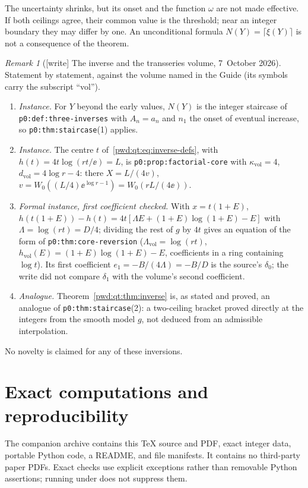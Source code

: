 \documentclass[11pt,letterpaper]{article}
\numberwithin{equation}{section}
\theoremstyle{remark}\newtheorem{remark}[theorem]{Remark}
\newcommand{\code}[1]{\texttt{\detokenize{#1}}}
\newcommand{\file}[1]{\nolinkurl{#1}}
\newcommand{\vol}{\mathrm{vol}}
\begin{document}
The uncertainty shrinks, but its onset and the function $\omega$ are not made effective. If both ceilings agree, their common value is the threshold; near an integer boundary they may differ by one. An unconditional formula $N(Y)=\lceil\xi(Y)\rceil$ is not a consequence of the theorem.

\begin{remark}[{[write]} The inverse and the transseries volume, 7~October 2026]\label{pwd:qt:rem:transseries}
Statement by statement, against the volume named in the Guide (its symbols
carry the subscript ``vol'').
\begin{enumerate}[label=(\alph*),leftmargin=*]
\item \emph{Instance.} For $Y$ beyond the early values, $N(Y)$ is the integer
staircase of \file{p0:def:three-inverses} with $A_n=a_n$ and $n_1$ the onset
of eventual increase, so \file{p0:thm:staircase}(1) applies.
\item \emph{Instance.} The centre $t$ of~\eqref{pwd:qt:eq:inverse-defs},
with $h(t)=4t\log(rt/\ee)=L$, is \file{p0:prop:factorial-core} with
$\kappa_\vol=4$, $d_\vol=4\log r-4$: there $X=L/(4v)$,
$v=W_0((L/4)\ee^{\log r-1})=W_0(rL/(4\ee))$.
\item \emph{Formal instance, first coefficient checked.} With $x=t(1+E)$,
$h(t(1+E))-h(t)=4t[\Lambda E+(1+E)\log(1+E)-E]$ with $\Lambda=\log(rt)=D/4$;
dividing the rest of $g$ by $4t$ gives an equation of the form of
\file{p0:thm:core-reversion} ($\Lambda_\vol=\log(rt)$,
$h_\vol(E)=(1+E)\log(1+E)-E$, coefficients in a ring containing $\log t$).
Its first coefficient $e_1=-B/(4\Lambda)=-B/D$ is the source's $\delta_0$;
the write did not compare $\delta_1$ with the volume's second coefficient.
\item \emph{Analogue.} Theorem~\ref{pwd:qt:thm:inverse} is, as stated and
proved, an analogue of \file{p0:thm:staircase}(2): a two-ceiling bracket
proved directly at the integers from the smooth model $g$, not deduced from
an admissible interpolation.
\end{enumerate}
No novelty is claimed for any of these inversions.
\end{remark}

\section{Exact computations and reproducibility}\label{pwd:qt:sec:computation}
The companion archive contains this TeX source and PDF, exact integer data, portable Python code, a README, and file manifests. It contains no third-party paper PDFs. Exact checks use explicit exceptions rather than removable Python assertions; running under \code{python -O} does not suppress them.
\end{document}
